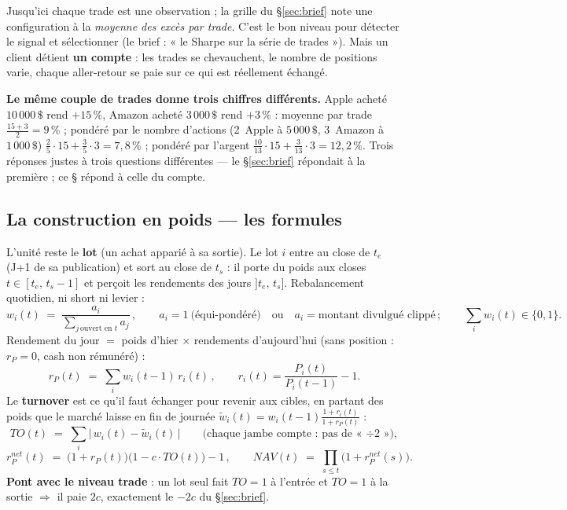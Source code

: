 \documentclass[11pt,a4paper]{article}
\begin{document}
Jusqu'ici chaque trade est une observation ; la grille du \S\ref{sec:brief} note une configuration à la
\emph{moyenne des excès par trade}. C'est le bon niveau pour détecter le signal et sélectionner (le brief :
« le Sharpe sur la série de trades »). Mais un client détient \textbf{un compte} : les trades se
chevauchent, le nombre de positions varie, chaque aller-retour se paie sur ce qui est réellement échangé.

\textbf{Le même couple de trades donne trois chiffres différents.} Apple acheté $10\,000\,\$$ rend
$+15\,\%$, Amazon acheté $3\,000\,\$$ rend $+3\,\%$ :
moyenne par trade $\frac{15+3}{2}=9\,\%$ ; pondéré par le nombre d'actions (2~Apple à $5\,000\,\$$,
3~Amazon à $1\,000\,\$$) $\frac{2}{5}\cdot15+\frac{3}{5}\cdot3=7{,}8\,\%$ ; pondéré par l'argent
$\frac{10}{13}\cdot15+\frac{3}{13}\cdot3=12{,}2\,\%$. Trois réponses justes à trois questions différentes
--- le \S\ref{sec:brief} répondait à la première ; ce \S{} répond à celle du compte.

\subsection{La construction en poids --- les formules}
L'unité reste le \textbf{lot} (un achat apparié à sa sortie). Le lot $i$ entre au close de $t_e$ (J+1 de
sa publication) et sort au close de $t_s$ : il porte du poids aux closes $t\in[t_e,\,t_s-1]$ et perçoit
les rendements des jours $]t_e,\,t_s]$. Rebalancement quotidien, ni short ni levier :
\begin{equation}
w_i(t) \;=\; \frac{a_i}{\sum_{j\,\text{ouvert en }t} a_j}\,,\qquad
a_i = 1 \ \text{(équi-pondéré)} \quad\text{ou}\quad a_i = \text{montant divulgué clippé}\,;
\qquad \textstyle\sum_i w_i(t)\in\{0,1\}.
\end{equation}
Rendement du jour $=$ poids d'hier $\times$ rendements d'aujourd'hui (sans position : $r_P=0$, cash non
rémunéré) :
\begin{equation}
r_P(t) \;=\; \sum_i w_i(t{-}1)\,r_i(t)\,,\qquad r_i(t)=\frac{P_i(t)}{P_i(t{-}1)}-1 .
\end{equation}
Le \textbf{turnover} est ce qu'il faut échanger pour revenir aux cibles, en partant des poids que le
marché laisse en fin de journée $\tilde w_i(t) = w_i(t{-}1)\frac{1+r_i(t)}{1+r_P(t)}$ :
\begin{equation}
TO(t) \;=\; \sum_i \big|\,w_i(t)-\tilde w_i(t)\,\big|
\qquad\text{(chaque jambe compte : pas de « $\div2$ »)},
\end{equation}
\begin{equation}
r_P^{net}(t) \;=\; \big(1+r_P(t)\big)\big(1-c\cdot TO(t)\big)-1\,,\qquad
NAV(t) \;=\; \prod_{s\leq t}\big(1+r_P^{net}(s)\big).
\end{equation}
\textbf{Pont avec le niveau trade} : un lot seul fait $TO=1$ à l'entrée et $TO=1$ à la sortie
$\Rightarrow$ il paie $2c$, exactement le $-2c$ du \S\ref{sec:brief}.
\end{document}
